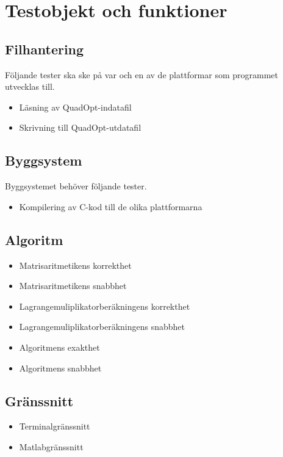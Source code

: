 \section{Testobjekt och funktioner}

\subsection{Filhantering}
Följande tester ska ske på var och en av de plattformar som programmet utvecklas till.
\begin{itemize}
	\item{Läsning av QuadOpt-indatafil}
	\item{Skrivning till QuadOpt-utdatafil}
\end{itemize}

\subsection{Byggsystem}
Byggsystemet behöver följande tester.
\begin{itemize}
	\item{Kompilering av C-kod till de olika plattformarna}
\end{itemize}

\subsection{Algoritm}
\begin{itemize}
	\item{Matrisaritmetikens korrekthet}
	\item{Matrisaritmetikens snabbhet}
	\item{Lagrangemuliplikatorberäkningens korrekthet}
	\item{Lagrangemuliplikatorberäkningens snabbhet}
	\item{Algoritmens exakthet}
	\item{Algoritmens snabbhet}
\end{itemize}

\subsection{Gränssnitt}
\begin{itemize}
	\item{Terminalgränssnitt}
	\item{Matlabgränssnitt}
\end{itemize}

